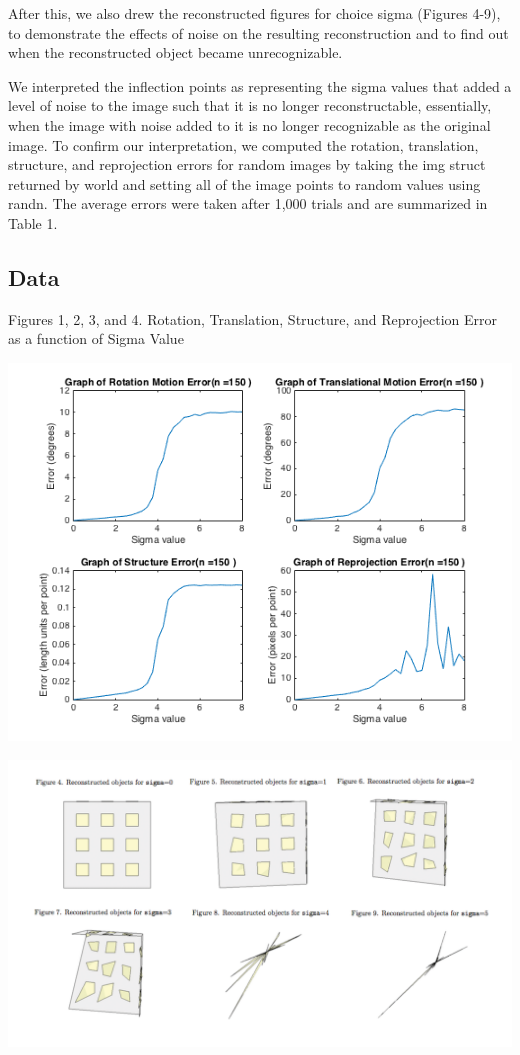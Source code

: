 \documentclass{article}
\begin{document}
After this, we also drew the reconstructed figures for choice sigma (Figures 4-9), to demonstrate the effects of noise on the resulting reconstruction and to find out when the reconstructed object became unrecognizable.

We interpreted the inflection points as representing the sigma values that added a level of noise to the image such that it is no longer reconstructable, essentially, when the image with noise added to it is no longer recognizable as the original image. To confirm our interpretation, we computed the rotation, translation, structure, and reprojection errors for random images by taking the img struct returned by world and setting all of the image points to random values using randn. The average errors were taken after 1,000 trials and are summarized in Table 1.


\subsection{Data}
\begin{center}
	\begin{center}Figures 1, 2, 3, and 4. Rotation, Translation, Structure, and Reprojection Error as a function of Sigma Value\end{center}
	\includegraphics[width=.7\textwidth,keepaspectratio]{experiment_1_error_plots.png}

	\includegraphics[width=\textwidth,keepaspectratio]{reconstructed_objects.png}
\end{center}
\end{document}
